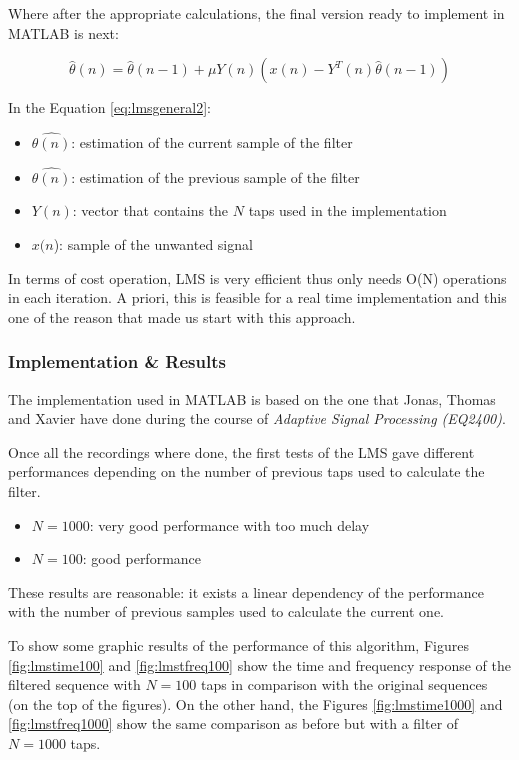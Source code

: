 \documentclass[11pt,a4paper,spanish]{book}  %
\theoremstyle{definition}  %
\theoremstyle{plain}  %
\theoremstyle{remark}  %
\begin{document}
	Where after the appropriate calculations, the final version ready to implement in MATLAB is next:
	
	\begin{equation}
	\label{eq:lmsgeneral2}
		\hat{\theta}(n) = \hat{\theta}(n-1) + \mu Y(n)(x(n)-Y^{T}(n)\hat{\theta}(n-1))
	\end{equation}
	
	In the Equation \ref{eq:lmsgeneral2}:
	
	\begin{itemize}
	\item $\hat{\theta(n)}$: estimation of the current sample of the filter
	\item $\hat{\theta(n)}$: estimation of the previous sample of the filter
	\item $Y(n)$: vector that contains the $N$ taps used in the implementation
	\item $x(n$): sample of the unwanted signal
	\end{itemize}
	
	In terms of cost operation, LMS is very efficient thus only needs O(N) operations in each iteration. A priori, this is feasible for a real time implementation and this one of the reason that made us start with this approach.
	
	\subsubsection{Implementation \& Results}
	
	The implementation used in MATLAB is based on the one that Jonas, Thomas and Xavier have done during the course of \textit{Adaptive Signal Processing (EQ2400)}.
	
	Once all the recordings where done, the first tests of the LMS gave different performances depending on the number of previous taps used to calculate the filter.
	
	\begin{itemize}
	\item $N=1000$: very good performance with too much delay
	\item $N=100$: good performance
	\end{itemize}
	
	These results are reasonable: it exists a linear dependency of the performance with the number of previous samples used to calculate the current one.
	
	To show some graphic results of the performance of this algorithm, Figures \ref{fig:lmstime100} and \ref{fig:lmstfreq100} show the time and frequency response of the filtered sequence with $N=100$ taps in comparison with the original sequences (on the top of the figures). On the other hand,  the Figures \ref{fig:lmstime1000} and \ref{fig:lmstfreq1000} show the same comparison as before but with a filter of $N=1000$ taps.
\end{document}

